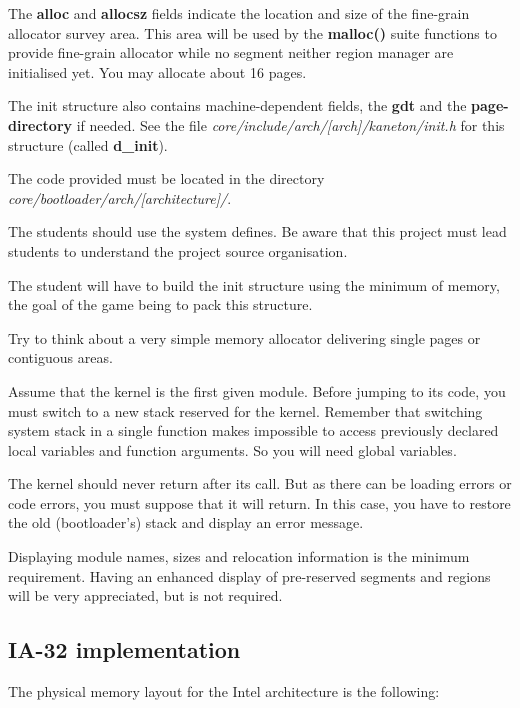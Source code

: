 The \textbf{alloc}  and \textbf{allocsz} fields  indicate the location
and size  of the fine-grain allocator  survey area. This  area will be
used by  the \textbf{malloc()}  suite functions to  provide fine-grain
allocator  while no  segment  neither region  manager are  initialised
yet. You may allocate about 16 pages.

The  init  structure   also  contains  machine-dependent  fields,  the
\textbf{gdt} and the \textbf{page-directory}  if needed.  See the file
\textit{core/include/arch/[arch]/kaneton/init.h}  for  this  structure
(called \textbf{d\_init}).

The code provided must be located in the directory
\textit{core/bootloader/arch/[architecture]/}.

The students should use the system defines. Be aware that this project
must lead students to understand the project source organisation.

The student will have to build the init structure using the minimum
of memory, the goal of the game being to pack this structure.

Try to  think about a  very simple memory allocator  delivering single
pages or contiguous areas.

Assume that  the kernel is the  first given module.  Before jumping to
its  code,  you   must  switch  to  a  new   stack  reserved  for  the
kernel.  Remember that  switching system  stack in  a  single function
makes  impossible to  access previously  declared local  variables and
function arguments. So you will need global variables.

The kernel  should never return  after its call.  But as there  can be
loading  errors  or  code  errors,  you  must  suppose  that  it  will
return. In this case, you have to restore the old (bootloader's) stack
and display an error message.

Displaying  module  names, sizes  and  relocation  information is  the
minimum  requirement.   Having  an  enhanced display  of  pre-reserved
segments and regions will be very appreciated, but is not required.

%
%

\subsection{IA-32 implementation}

The physical memory layout for the Intel architecture is the following:

